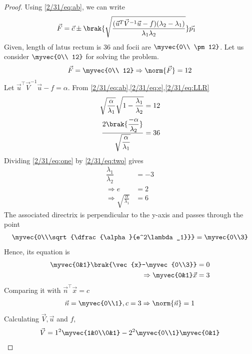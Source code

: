 \documentclass[journal,12pt,twocolumn]{IEEEtran}
\begin{document}
\begin{proof}
Using \eqref{2/31/eq:ab}, we can write
\begin{align}
  \vec{F} &=\vec{c}\pm\brak{\sqrt{\frac{(\vec{u}^T\vec{V}^{-1}\vec{u}-f)(\lambda_2-\lambda_1)}{\lambda_1\lambda_2}}}\vec{p_1} \label{2/31/eq:foci}
\end{align}
Given, length of latus rectum is 36 and focii are $\myvec{0\\ \pm12}$. Let us consider $\myvec{0\\ 12}$ for solving the problem.
\begin{align}
    \vec{F} =\myvec{0\\ 12}\Rightarrow\norm{\vec{F}}=12
\end{align}
Let $\vec{u}^{\top}\vec{V}^{-1}\vec{u}-f=\alpha$. From \eqref{2/31/eq:ab},\eqref{2/31/eq:e},\eqref{2/31/eq:LLR}
\begin{align}
    \sqrt{\dfrac{\alpha}{\lambda_1}}\sqrt{1-\frac{\lambda_1}{\lambda_2}}=12\label{2/31/eq:one}\\
    \dfrac{2\brak{\dfrac{-\alpha}{\lambda_2}}}{\sqrt{\dfrac{\alpha}{\lambda_1}}}=36\label{2/31/eq:two}
\end{align}
Dividing \eqref{2/31/eq:one} by \eqref{2/31/eq:two} gives
\begin{align}
    \dfrac{\lambda_1}{\lambda_2}&=-3\\
    \Rightarrow e&=2\label{2/31/eq:q}\\
    \Rightarrow \sqrt{\frac{\alpha}{\lambda_1}}&=6\label{2/31/eq:w}
\end{align}
The associated directrix is perpendicular to the y-axis and passes through the point
\begin{align}
\myvec{0\\\sqrt{\dfrac{\alpha}{e^2\lambda_1}}}=\myvec{0\\3}
\end{align}
Hence, its equation is
\begin{align}
    \myvec{0&1}\brak{\vec{x}-\myvec{0\\3}} &= 0\\
    \Rightarrow \myvec{0&1}\vec{x} &= 3
\end{align}
Comparing it with $\vec{n}^{\top}\vec{x} = c$
\begin{align}
    \vec{n} = \myvec{0\\1}, c = 3\Rightarrow \norm{\vec{n}} = 1
\end{align}
Calculating $\vec{V}, \vec{u}$ and $f$,
\begin{align}
    \vec{V}&=1^2\myvec{1&0\\0&1} - 2^2\myvec{0\\1}\myvec{0&1}\\

\end{align}
\end{proof}
\end{document}
